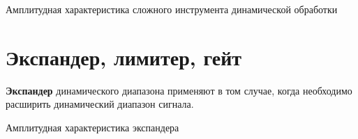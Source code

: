 \documentclass{beamer}
\begin{document}
\begin{frame}
  \begin{block}{Амплитудная характеристика сложного инструмента динамической обработки}
  \end{block}
\end{frame}

\section{Экспандер, лимитер, гейт}
\begin{frame}
  \textbf{Экспандер} динамического диапазона применяют в том случае, когда необходимо расширить динамический диапазон сигнала.

  \begin{block}{Амплитудная характеристика экспандера}
  \end{block}
\end{frame}
\end{document}

